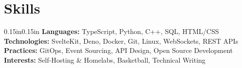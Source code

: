 \section{Skills}
\footnotesize
\begin{adjustwidth}{0.15in}{0.15in}
\textbf{Languages:} TypeScript, Python, C++, SQL, HTML/CSS \\[6pt]
\textbf{Technologies:} SvelteKit, Deno, Docker, Git, Linux, WebSockets, REST APIs \\[6pt]
\textbf{Practices:} GitOps, Event Sourcing, API Design, Open Source Development \\[6pt]
\textbf{Interests:} Self-Hosting \& Homelabs, Basketball, Technical Writing
\end{adjustwidth}